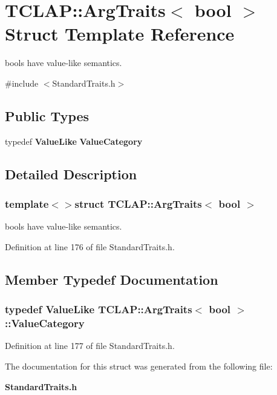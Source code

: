\section{T\+C\+L\+A\+P\+:\+:Arg\+Traits$<$ bool $>$ Struct Template Reference}
\label{structTCLAP_1_1ArgTraits_3_01bool_01_4}


bools have value-\/like semantics.  




{\ttfamily \#include $<$Standard\+Traits.\+h$>$}

\subsection*{Public Types}
\begin{DoxyCompactItemize}
\item 
typedef {\bf Value\+Like} {\bf Value\+Category}
\end{DoxyCompactItemize}


\subsection{Detailed Description}
\subsubsection*{template$<$$>$struct T\+C\+L\+A\+P\+::\+Arg\+Traits$<$ bool $>$}

bools have value-\/like semantics. 

Definition at line 176 of file Standard\+Traits.\+h.



\subsection{Member Typedef Documentation}
\subsubsection[{Value\+Category}]{\setlength{\rightskip}{0pt plus 5cm}typedef {\bf Value\+Like} {\bf T\+C\+L\+A\+P\+::\+Arg\+Traits}$<$ bool $>$\+::{\bf Value\+Category}}\label{structTCLAP_1_1ArgTraits_3_01bool_01_4_a86efe13e981aaef96d37ec465a8409a7}


Definition at line 177 of file Standard\+Traits.\+h.



The documentation for this struct was generated from the following file\+:\begin{DoxyCompactItemize}
\item 
{\bf Standard\+Traits.\+h}\end{DoxyCompactItemize}
